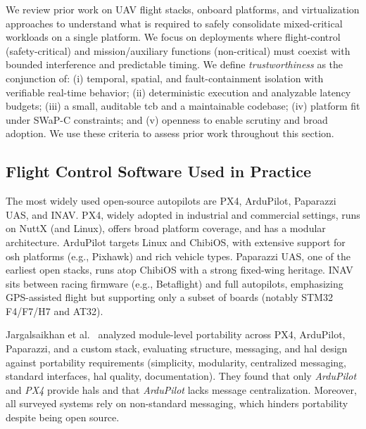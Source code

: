 We review prior work on UAV flight stacks, onboard platforms, and virtualization
approaches to understand what is required to safely consolidate mixed-critical
workloads on a single platform.
We focus on deployments where flight-control (safety-critical) and
mission/auxiliary functions (non-critical) must coexist with bounded
interference and predictable timing.
We define \emph{trustworthiness} as the conjunction of: (i) temporal, spatial,
and fault-containment isolation with verifiable real-time behavior; (ii)
deterministic execution and analyzable latency budgets; (iii) a small, auditable
\gls{tcb} and a maintainable codebase; (iv) platform fit under SWaP-C
constraints; and (v) openness to enable scrutiny and broad adoption.
We use these criteria to assess prior work throughout this section.


\subsection{Flight Control Software Used in Practice}
\label{subsec:rw-flight-stacks}
The most widely used open-source autopilots are PX4, ArduPilot, Paparazzi UAS,
and INAV.
PX4, widely adopted in industrial and commercial settings, runs on NuttX (and
Linux), offers broad platform coverage, and has a modular architecture.
ArduPilot targets Linux and ChibiOS, with extensive support for \gls{osh}
platforms (e.g., Pixhawk) and rich vehicle types.
Paparazzi UAS, one of the earliest open stacks, runs atop ChibiOS with a strong
fixed-wing heritage.
INAV sits between racing firmware (e.g., Betaflight) and full autopilots,
emphasizing GPS-assisted flight but supporting only a subset of boards (notably
STM32 F4/F7/H7 and AT32).

Jargalsaikhan et al.~\cite{jargalsaikhan2022architectural} analyzed module-level
portability across PX4, ArduPilot, Paparazzi, and a custom stack, evaluating
structure, messaging, and \gls{hal} design against portability requirements
(simplicity, modularity, centralized messaging, standard interfaces, \gls{hal}
quality, documentation). They found that only \emph{ArduPilot} and \emph{PX4}
provide \glspl{hal} and that \emph{ArduPilot} lacks message
centralization. Moreover, all surveyed systems rely on non-standard messaging,
which hinders portability despite being open source.

